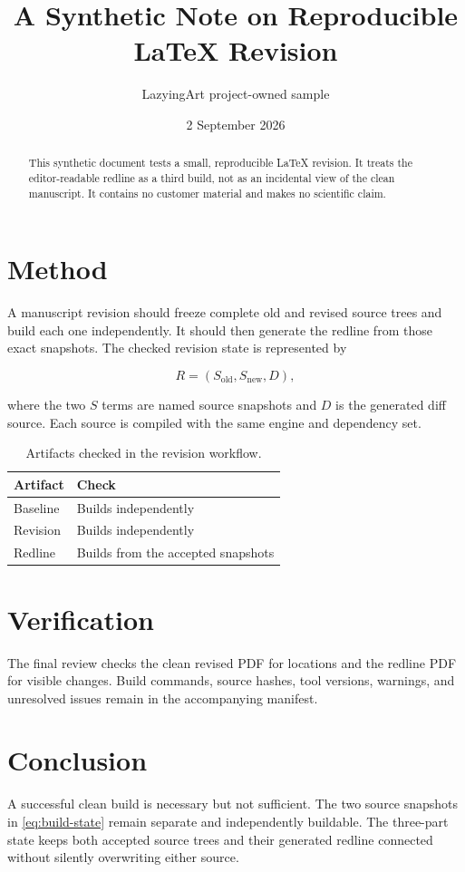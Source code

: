 \documentclass[11pt,a4paper]{article}
\title{A Synthetic Note on Reproducible LaTeX Revision}
\author{LazyingArt project-owned sample}
\date{2 September 2026}
\begin{document}
\maketitle

\begin{abstract}
This synthetic document tests a small, reproducible LaTeX revision. It treats
the editor-readable redline as a third build, not as an incidental view of the
clean manuscript. It contains no customer material and makes no scientific
claim.
\end{abstract}

\section{Method}

A manuscript revision should freeze complete old and revised source trees and
build each one independently. It should then generate the redline from those
exact snapshots. The checked revision state is represented by

\begin{equation}
  R = (S_{\mathrm{old}}, S_{\mathrm{new}}, D),
  \label{eq:build-state}
\end{equation}

where the two $S$ terms are named source snapshots and $D$ is the generated
diff source. Each source is compiled with the same engine and dependency set.

\begin{table}[ht]
  \centering
  \caption{Artifacts checked in the revision workflow.}
  \label{tab:artifacts}
  \begin{tabular}{ll}
    \toprule
    Artifact & Check \\
    \midrule
    Baseline & Builds independently \\
    Revision & Builds independently \\
    Redline & Builds from the accepted snapshots \\
    \bottomrule
  \end{tabular}
\end{table}

\section{Verification}

The final review checks the clean revised PDF for locations and the redline PDF
for visible changes. Build commands, source hashes, tool versions, warnings,
and unresolved issues remain in the accompanying manifest.

\section{Conclusion}

A successful clean build is necessary but not sufficient. The two source
snapshots in \eqref{eq:build-state} remain separate and independently buildable.
The three-part state keeps both accepted source trees and their generated
redline connected without silently overwriting either source.
\end{document}
